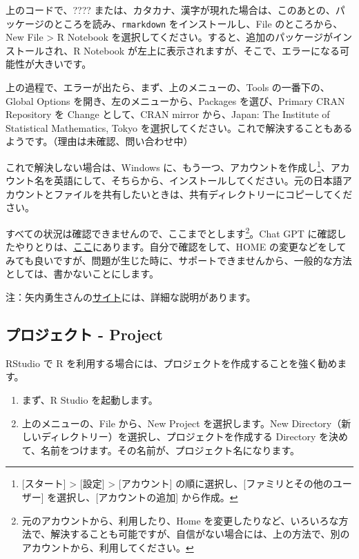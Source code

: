 \documentclass[
]{bxjsbook}
\theoremstyle{definition}
\theoremstyle{definition}
\theoremstyle{definition}
\theoremstyle{definition}
\theoremstyle{remark}
\begin{document}
上のコードで、???? または、カタカナ、漢字が現れた場合は、このあとの、パッケージのところを読み、\texttt{rmarkdown} をインストールし、File のところから、New File \textgreater{} R Notebook を選択してください。すると、追加のパッケージがインストールされ、R Notebook が左上に表示されますが、そこで、エラーになる可能性が大きいです。

上の過程で、エラーが出たら、まず、上のメニューの、Tools の一番下の、Global Options を開き、左のメニューから、Packages を選び、Primary CRAN Repository を Change として、CRAN mirror から、Japan: The Institute of Statistical Mathematics, Tokyo を選択してください。これで解決することもあるようです。（理由は未確認、問い合わせ中）

これで解決しない場合は、Windows に、もう一つ、アカウントを作成し\footnote{{[}スタート{]} \textgreater{} {[}設定{]} \textgreater{} {[}アカウント{]} の順に選択し、{[}ファミリとその他のユーザー{]} を選択し、{[}アカウントの追加{]} から作成。}、アカウント名を英語にして、そちらから、インストールしてください。元の日本語アカウントとファイルを共有したいときは、共有ディレクトリーにコピーしてください。

すべての状況は確認できませんので、ここまでとします\footnote{元のアカウントから、利用したり、Home を変更したりなど、いろいろな方法で、解決することも可能ですが、自信がない場合には、上の方法で、別のアカウントから、利用してください。}。Chat GPT に確認したやりとりは、\href{https://icu-hsuzuki.github.io/ds_education/chatgpt.html\#chatgpt}{ここ}にあります。自分で確認をして、HOME の変更などをしてみても良いですが、問題が生じた時に、サポートできませんから、一般的な方法としては、書かないことにします。

注：矢内勇生さんの\href{https://yukiyanai.github.io/jp/resources/docs/install-R_windows.pdf}{サイト}には、詳細な説明があります。

\hypertarget{ux30d7ux30edux30b8ux30a7ux30afux30c8---project}{%
\subsection{プロジェクト - Project}\label{ux30d7ux30edux30b8ux30a7ux30afux30c8---project}}

RStudio で R を利用する場合には、プロジェクトを作成することを強く勧めます。

\begin{enumerate}
\def\labelenumi{\arabic{enumi}.}
\item
  まず、R Studio を起動します。
\item
  上のメニューの、File から、New Project を選択します。New Directory（新しいディレクトリー）を選択し、プロジェクトを作成する Directory を決めて、名前をつけます。その名前が、プロジェクト名になります。
\end{enumerate}
\end{document}
